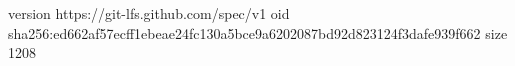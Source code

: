version https://git-lfs.github.com/spec/v1
oid sha256:ed662af57ecff1ebeae24fc130a5bce9a6202087bd92d823124f3dafe939f662
size 1208
